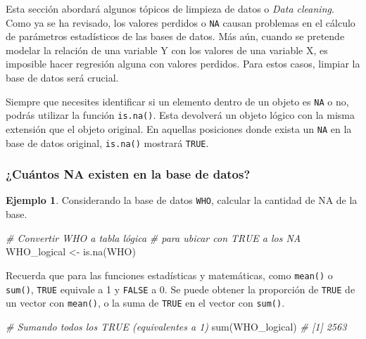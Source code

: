 \documentclass[
]{article}
\newenvironment{Shaded}{\begin{snugshade}}{\end{snugshade}}
\newcommand{\CommentTok}[1]{\textcolor[rgb]{0.56,0.35,0.01}{\textit{#1}}}
\newcommand{\FunctionTok}[1]{\textcolor[rgb]{0.00,0.00,0.00}{#1}}
\newcommand{\NormalTok}[1]{#1}
\newcommand{\OtherTok}[1]{\textcolor[rgb]{0.56,0.35,0.01}{#1}}
\theoremstyle{definition}
\theoremstyle{definition}
\newtheorem{example}{Ejemplo}[section]
\theoremstyle{definition}
\theoremstyle{definition}
\theoremstyle{remark}
\begin{document}
Esta sección abordará algunos tópicos de limpieza de datos o \emph{Data cleaning}. Como ya se ha revisado, los valores perdidos o \texttt{NA} causan problemas en el cálculo de parámetros estadísticos de las bases de datos. Más aún, cuando se pretende modelar la relación de una variable Y con los valores de una variable X, es imposible hacer regresión alguna con valores perdidos. Para estos casos, limpiar la base de datos será crucial.

\begin{rmdnote}
Siempre que necesites identificar si un elemento dentro de un objeto es \texttt{NA} o no, podrás utilizar la función \texttt{is.na()}. Esta devolverá un objeto lógico con la misma extensión que el objeto original. En aquellas posiciones donde exista un \texttt{NA} en la base de datos original, \texttt{is.na()} mostrará \texttt{TRUE}.
\end{rmdnote}

\hypertarget{cuuxe1ntos-na-existen-en-la-base-de-datos}{%
\subsubsection{¿Cuántos NA existen en la base de datos?}\label{cuuxe1ntos-na-existen-en-la-base-de-datos}}

\begin{example}

Considerando la base de datos \texttt{WHO}, calcular la cantidad de NA de la base.

\begin{Shaded}
\begin{Highlighting}[]
\CommentTok{\# Convertir WHO a tabla lógica }
\CommentTok{\# para ubicar con TRUE a los NA}
\NormalTok{WHO\_logical }\OtherTok{\textless{}{-}} \FunctionTok{is.na}\NormalTok{(WHO)}
\end{Highlighting}
\end{Shaded}

Recuerda que para las funciones estadísticas y matemáticas, como \texttt{mean()} o \texttt{sum()}, \texttt{TRUE} equivale a 1 y \texttt{FALSE} a 0. Se puede obtener la proporción de \texttt{TRUE} de un vector con \texttt{mean()}, o la suma de \texttt{TRUE} en el vector con \texttt{sum()}.

\begin{Shaded}
\begin{Highlighting}[]
\CommentTok{\# Sumando todos los TRUE (equivalentes a 1)}
\FunctionTok{sum}\NormalTok{(WHO\_logical)}
\CommentTok{\# [1] 2563}
\end{Highlighting}
\end{Shaded}

\end{example}
\end{document}
